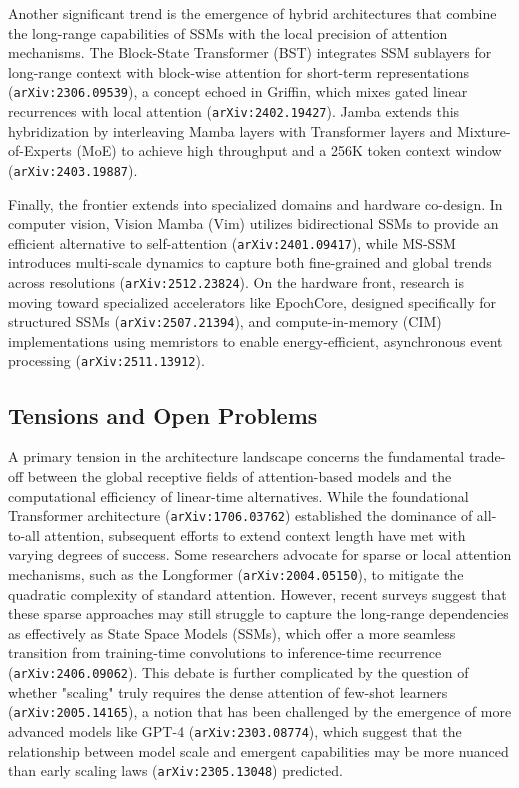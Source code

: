 \documentclass[11pt]{article}
\begin{document}
Another significant trend is the emergence of hybrid architectures that combine the long-range capabilities of SSMs with the local precision of attention mechanisms. The Block-State Transformer (BST) integrates SSM sublayers for long-range context with block-wise attention for short-term representations (\texttt{arXiv:2306.09539}), a concept echoed in Griffin, which mixes gated linear recurrences with local attention (\texttt{arXiv:2402.19427}). Jamba extends this hybridization by interleaving Mamba layers with Transformer layers and Mixture-of-Experts (MoE) to achieve high throughput and a 256K token context window (\texttt{arXiv:2403.19887}).

Finally, the frontier extends into specialized domains and hardware co-design. In computer vision, Vision Mamba (Vim) utilizes bidirectional SSMs to provide an efficient alternative to self-attention (\texttt{arXiv:2401.09417}), while MS-SSM introduces multi-scale dynamics to capture both fine-grained and global trends across resolutions (\texttt{arXiv:2512.23824}). On the hardware front, research is moving toward specialized accelerators like EpochCore, designed specifically for structured SSMs (\texttt{arXiv:2507.21394}), and compute-in-memory (CIM) implementations using memristors to enable energy-efficient, asynchronous event processing (\texttt{arXiv:2511.13912}).

\subsection{Tensions and Open Problems}

A primary tension in the architecture landscape concerns the fundamental trade-off between the global receptive fields of attention-based models and the computational efficiency of linear-time alternatives. While the foundational Transformer architecture (\texttt{arXiv:1706.03762}) established the dominance of all-to-all attention, subsequent efforts to extend context length have met with varying degrees of success. Some researchers advocate for sparse or local attention mechanisms, such as the Longformer (\texttt{arXiv:2004.05150}), to mitigate the quadratic complexity of standard attention. However, recent surveys suggest that these sparse approaches may still struggle to capture the long-range dependencies as effectively as State Space Models (SSMs), which offer a more seamless transition from training-time convolutions to inference-time recurrence (\texttt{arXiv:2406.09062}). This debate is further complicated by the question of whether "scaling" truly requires the dense attention of few-shot learners (\texttt{arXiv:2005.14165}), a notion that has been challenged by the emergence of more advanced models like GPT-4 (\texttt{arXiv:2303.08774}), which suggest that the relationship between model scale and emergent capabilities may be more nuanced than early scaling laws (\texttt{arXiv:2305.13048}) predicted.
\end{document}

